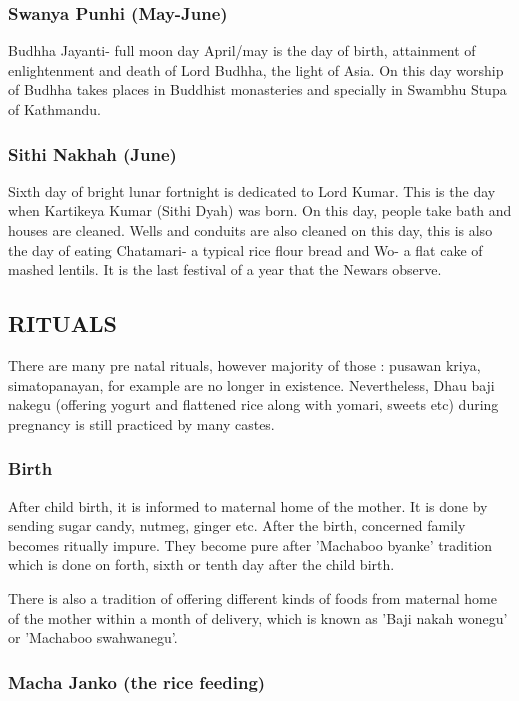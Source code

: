 \documentclass[a4paper,13pt, margin=0.9in]{article}
\begin{document}
\begin{flushleft}
\subsubsection{Swanya Punhi (May-June)}

Budhha Jayanti- full moon day April/may is the day of birth, attainment of enlightenment and death of Lord Budhha, the light of Asia. On this day worship of Budhha takes places in Buddhist monasteries and specially in Swambhu Stupa of Kathmandu.

\subsubsection{Sithi Nakhah (June)}

Sixth day of bright lunar fortnight is dedicated to Lord Kumar. This is the day when Kartikeya Kumar (Sithi Dyah) was born. On this day, people take bath and houses are cleaned. Wells and conduits are also cleaned on this day, this is also the day of eating Chatamari- a typical rice flour bread and Wo- a flat cake of mashed lentils. It is the last festival of a year that the Newars observe.


\newpage

	\subsection{RITUALS}
	
There are many pre natal rituals, however majority of those : pusawan kriya, simatopanayan, for example are no longer in existence. Nevertheless, Dhau baji nakegu (offering yogurt and flattened rice along with yomari, sweets etc) during pregnancy is still practiced by many castes.

\subsubsection{Birth}

After child birth, it is informed to maternal home of the mother. It is done by sending sugar candy, nutmeg, ginger etc. After the birth, concerned family becomes ritually impure. They become pure after 'Machaboo byanke' tradition which is done on forth, sixth or tenth day after the child birth.

There is also a tradition of offering different kinds of foods from maternal home of the mother within a month of delivery, which is known as 'Baji nakah wonegu' or 'Machaboo swahwanegu'.

\subsubsection{Macha Janko (the rice feeding)}


\end{flushleft}
\end{document}
